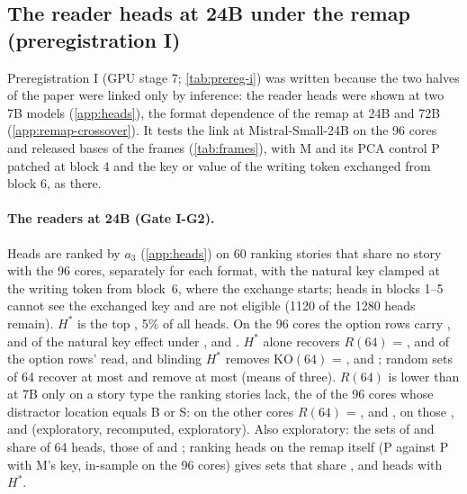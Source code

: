 \subsection{The reader heads at 24B under the remap (preregistration I)}\label{app:stage7}\label{sec:link}

Preregistration I (GPU stage 7; \cref{tab:prereg-i}) was written because the two halves of the paper were linked only by inference: the reader heads were shown at two 7B models (\cref{app:heads}), the format dependence of the remap at 24B and 72B (\cref{app:remap-crossover}). It tests the link at Mistral-Small-24B on the 96 cores and released bases of the frames (\cref{tab:frames}), with M and its PCA control P patched at block 4 and the key or value of the writing token exchanged from block 6, as there.

\paragraph{The readers at 24B (Gate I-G2).} Heads are ranked by $a_3$ (\cref{app:heads}) on 60 ranking stories that share no story with the 96 cores, separately for each format, with the natural key clamped at the writing token from block~6, where the exchange starts; heads in blocks 1--5 cannot see the exchanged key and are not eligible (1120 of the 1280 heads remain). $H^*$ is the top \Ikstar{}, 5\% of all heads. On the 96 cores the option rows carry \IgtwoRatioOpt{}, \IgtwoRatioLetter{} and \IgtwoRatioPost{} of the natural key effect under \fmtOpt{}, \fmtLetter{} and \fmtPost{}. $H^*$ alone recovers $R(64)$ = \IgtwoROpt{}, \IgtwoRLetter{} and \IgtwoRPost{} of the option rows' read, and blinding $H^*$ removes $\mathrm{KO}(64)$ = \IgtwoKOOpt{}, \IgtwoKOLetter{} and \IgtwoKOPost{}; random sets of 64 recover at most \IgtwoRrandPost{} and remove at most \IgtwoKOrandPost{} (means of three). $R(64)$ is lower than at 7B only on a story type the ranking stories lack, the \InDist{} of the 96 cores whose distractor location equals B or S: on the other cores $R(64)$ = \IrSixtyfourRestOpt{}, \IrSixtyfourRestLetter{} and \IrSixtyfourRestPost{}, on those \IrSixtyfourDistOpt{}, \IrSixtyfourDistLetter{} and \IrSixtyfourDistPost{} (exploratory, recomputed, exploratory). Also exploratory: the sets of \fmtOpt{} and \fmtLetter{} share \IxOverlapOptLetter{} of 64 heads, those of \fmtOpt{} and \fmtPost{} \IxOverlapOptPost{}; ranking heads on the remap itself (P against P with M's key, in-sample on the 96 cores) gives sets that share \IremOverlapOpt{}, \IremOverlapLetter{} and \IremOverlapPost{} heads with $H^*$.

